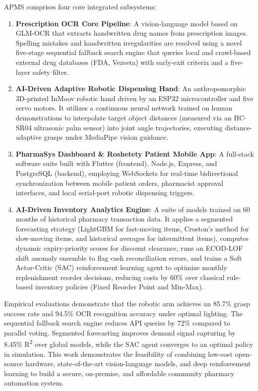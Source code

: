 \documentclass[12pt,a4paper,oneside]{report}
\begin{document}
APMS comprises four core integrated subsystems:

\begin{enumerate}
\def\labelenumi{\arabic{enumi})}
\item
  \textbf{Prescription OCR Core Pipeline}: A vision-language model based
  on GLM-OCR that extracts handwritten drug names from prescription
  images. Spelling mistakes and handwritten irregularities are resolved
  using a novel five-stage sequential fallback search engine that
  queries local and crawl-based external drug databases (FDA, Vezeeta)
  with early-exit criteria and a five-layer safety filter.
\item
  \textbf{AI-Driven Adaptive Robotic Dispensing Hand}: An
  anthropomorphic 3D-printed InMoov robotic hand driven by an ESP32
  microcontroller and five servo motors. It utilizes a continuous
  neural network trained on human demonstrations to interpolate target
  object distances (measured via an HC-SR04 ultrasonic palm sensor) into
  joint angle trajectories, executing distance-adaptive grasps under
  MediaPipe vision guidance.
\item
  \textbf{PharmaSys Dashboard \& Roshetety Patient Mobile App}: A
  full-stack software suite built with Flutter (frontend), Node.js,
  Express, and PostgreSQL (backend), employing WebSockets for real-time
  bidirectional synchronization between mobile patient orders,
  pharmacist approval interfaces, and local serial-port robotic
  dispensing triggers.
\item
  \textbf{AI-Driven Inventory Analytics Engine}: A suite of models
  trained on 60 months of historical pharmacy transaction data. It
  applies a segmented forecasting strategy (LightGBM for fast-moving
  items, Croston's method for slow-moving items, and historical averages
  for intermittent items), computes dynamic expiry-priority scores for
  discount clearance, runs an ECOD-LOF shift anomaly ensemble to flag
  cash reconciliation errors, and trains a Soft Actor-Critic (SAC)
  reinforcement learning agent to optimize monthly replenishment reorder
  decisions, reducing costs by 60\% over classical rule-based inventory policies (Fixed Reorder Point and Min-Max).
\end{enumerate}

Empirical evaluations demonstrate that the robotic arm achieves an
85.7\% grasp success rate and 94.5\% OCR recognition accuracy under
optimal lighting. The sequential fallback search engine reduces API
queries by 72\% compared to parallel voting. Segmented forecasting
improves demand signal capturing by 8.45\% R\textsuperscript{2} over
global models, while the SAC agent converges to an optimal policy in
simulation. This work demonstrates the feasibility of combining low-cost
open-source hardware, state-of-the-art vision-language models, and deep
reinforcement learning to build a secure, on-premise, and affordable
community pharmacy automation system.
\end{document}
